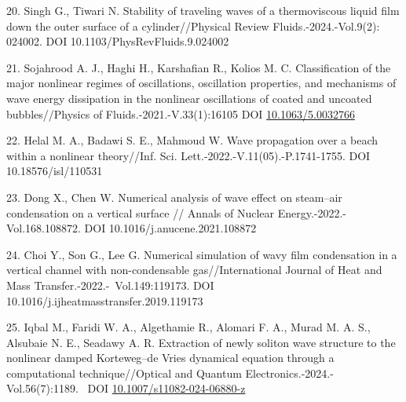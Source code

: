\begin{references}
20. Singh G., Tiwari N. Stability of traveling waves of a thermoviscous
liquid film down the outer surface of a cylinder//Physical Review
Fluids.-2024.-Vol.9(2): 024002.
DOI 10.1103/PhysRevFluids.9.024002

21. Sojahrood A. J., Haghi H., Karshafian R., Kolios M. C. Classification
of the major nonlinear regimes of oscillations, oscillation properties,
and mechanisms of wave energy dissipation in the nonlinear oscillations
of coated and uncoated bubbles//Physics of Fluids.-2021.-V.33(1):16105
DOI \href{http://dx.doi.org/10.1063/5.0032766}{10.1063/5.0032766}

22. Helal M. A., Badawi S. E., Mahmoud W. Wave propagation over a beach
within a nonlinear theory//Inf. Sci. Lett.-2022.-V.11(05).-P.1741-1755.
DOI 10.18576/isl/110531

23. Dong X., Chen W. Numerical analysis of wave effect on steam--air
condensation on a vertical surface // Annals of Nuclear
Energy.-2022.-Vol.168.108872.
DOI 10.1016/j.anucene.2021.108872

24. Choi Y., Son G., Lee G. Numerical simulation of wavy film
condensation in a vertical channel with non-condensable
gas//International Journal of Heat and Mass
Transfer.-2022.-~Vol.149:119173. DOI\\
10.1016/j.ijheatmasstransfer.2019.119173

25. Iqbal M., Faridi W. A., Algethamie R., Alomari F. A., Murad M. A. S.,
Alsubaie N. E., Seadawy A. R. Extraction of newly soliton wave structure
to the nonlinear damped Korteweg--de Vries dynamical equation through a
computational technique//Optical and Quantum
Electronics.-2024.-Vol.56(7):1189. ~DOI
\href{https://ui.adsabs.harvard.edu/link_gateway/2024OQEle..56.1189I/doi:10.1007/s11082-024-06880-z}{10.1007/s11082-024-06880-z}~
\end{references}

